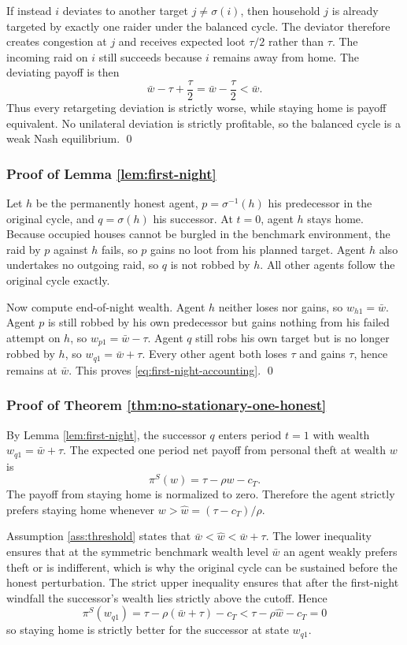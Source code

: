 If instead $i$ deviates to another target $j \neq \sigma(i)$, then household $j$ is already targeted by exactly one raider under the balanced cycle. The deviator therefore creates congestion at $j$ and receives expected loot $\tau/2$ rather than $\tau$. The incoming raid on $i$ still succeeds because $i$ remains away from home. The deviating payoff is then
\[
\bar{w} - \tau + \frac{\tau}{2}
=
\bar{w} - \frac{\tau}{2}
<
\bar{w}.
\]
Thus every retargeting deviation is strictly worse, while staying home is payoff equivalent. No unilateral deviation is strictly profitable, so the balanced cycle is a weak Nash equilibrium. \qed

\subsubsection*{Proof of Lemma \ref{lem:first-night}}

Let $h$ be the permanently honest agent, $p = \sigma^{-1}(h)$ his predecessor in the original cycle, and $q = \sigma(h)$ his successor. At $t=0$, agent $h$ stays home. Because occupied houses cannot be burgled in the benchmark environment, the raid by $p$ against $h$ fails, so $p$ gains no loot from his planned target. Agent $h$ also undertakes no outgoing raid, so $q$ is not robbed by $h$. All other agents follow the original cycle exactly.

Now compute end-of-night wealth. Agent $h$ neither loses nor gains, so $w_{h1} = \bar{w}$. Agent $p$ is still robbed by his own predecessor but gains nothing from his failed attempt on $h$, so $w_{p1} = \bar{w} - \tau$. Agent $q$ still robs his own target but is no longer robbed by $h$, so $w_{q1} = \bar{w} + \tau$. Every other agent both loses $\tau$ and gains $\tau$, hence remains at $\bar{w}$. This proves \eqref{eq:first-night-accounting}. \qed

\subsubsection*{Proof of Theorem \ref{thm:no-stationary-one-honest}}

By Lemma \ref{lem:first-night}, the successor $q$ enters period $t=1$ with wealth $w_{q1} = \bar{w} + \tau$. The expected one period net payoff from personal theft at wealth $w$ is
\[
\pi^{S}(w) = \tau - \rho w - c_T.
\]
The payoff from staying home is normalized to zero. Therefore the agent strictly prefers staying home whenever $w > \widehat{w} = (\tau - c_T)/\rho$.

Assumption \ref{ass:threshold} states that $\bar{w} < \widehat{w} < \bar{w} + \tau$. The lower inequality ensures that at the symmetric benchmark wealth level $\bar{w}$ an agent weakly prefers theft or is indifferent, which is why the original cycle can be sustained before the honest perturbation. The strict upper inequality ensures that after the first-night windfall the successor's wealth lies strictly above the cutoff. Hence
\[
\pi^{S}(w_{q1})
=
\tau - \rho(\bar{w}+\tau) - c_T
<
\tau - \rho\widehat{w} - c_T
=
0
\]
so staying home is strictly better for the successor at state $w_{q1}$.

